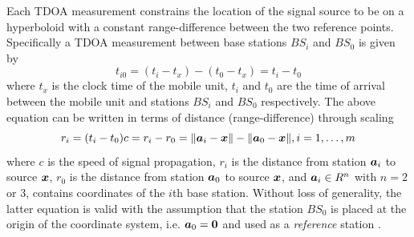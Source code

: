 Each TDOA measurement constrains the location of the signal source
to be on a hyperboloid with a constant range-difference between the two reference points. Specifically a TDOA measurement between base stations $BS_i$ and $BS_0$ is given by 
\begin{equation}
\nonumber
t_{i0} = (t_i - t_x) - (t_0 - t_x) = t_i - t_0
\end{equation}
where $t_x$ is the clock time of the mobile unit, $t_i$ and $t_0$ are the time of arrival between the mobile unit and  stations $BS_i$ and $BS_0$ respectively. The above equation can be written in terms of distance (range-difference) through scaling 
\begin{equation}
\nonumber
r_{i} =(t_i - t_0)c = r_i - r_0 = \|\mbox{\boldmath$a$}_i - \mbox{\boldmath$x$}\| - \|\mbox{\boldmath$a$}_0 - \mbox{\boldmath$x$}\|, i = 1,\ldots,m
\end{equation}
where $c$ is the speed of signal propagation, $r_i$ is the distance from station $\mbox{\boldmath$a$}_i$ to source $\mbox{\boldmath$x$}$, $r_0$ is the distance from station $\mbox{\boldmath$a$}_0$ to source $\mbox{\boldmath$x$}$, and $\mbox{\boldmath$a$}_i \in R^n$ with $n = 2$ or $3$, contains coordinates of the $i$th base station.  Without loss of generality, the latter equation is valid with the assumption that the station $BS_0$ is placed at the origin of the coordinate system, i.e. $\mbox{\boldmath$a$}_0 = \mbox{\boldmath{$0$}}$  and used as a \textit{reference} station \cite{GeoLoc}. 
 

